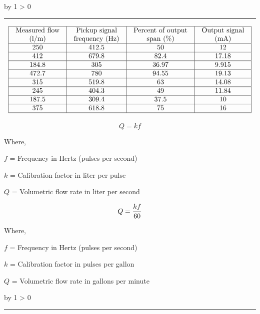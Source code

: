 \documentclass[12pt,a4paper]{article}
\def\svar{
           \advance\answnum by 1
           \ifnum \answnum > 0
                \hrule
                \vskip 3pt
                \leftline{Svar \the\answnum}
                \vskip 3pt \fi}
\def\notes{
           \advance\explnum by 1
           \ifnum \explnum > 0
                \hrule
                \vskip 3pt
                \leftline{Notes \the\explnum}
                \vskip 3pt \fi}
\begin{document}
\vskip 10pt \filbreak 





\svar{} 


$$\vbox{\offinterlineskip
\halign{\strut
\vrule \quad\hfil # \ \hfil & 
\vrule \quad\hfil # \ \hfil & 
\vrule \quad\hfil # \ \hfil & 
\vrule \quad\hfil # \ \hfil \vrule \cr
\noalign{\hrule}
%
Measured flow & Pickup signal & Percent of output & Output signal \cr
%
(l/m) & frequency (Hz) & span (\%) & (mA) \cr
%
\noalign{\hrule}
%
250 & 412.5 & 50 & 12 \cr
%
\noalign{\hrule}
%
412 & 679.8 & 82.4 & 17.18 \cr
%
\noalign{\hrule}
%
184.8 & 305 & 36.97 & 9.915 \cr
%
\noalign{\hrule}
%
472.7 & 780 & 94.55 & 19.13 \cr
%
\noalign{\hrule}
%
315 & 519.8 & 63 & 14.08 \cr
%
\noalign{\hrule}
%
245 & 404.3 & 49 & 11.84 \cr
%
\noalign{\hrule}
%
187.5 & 309.4 & 37.5 & 10 \cr
%
\noalign{\hrule}
%
375 & 618.8 & 75 & 16 \cr
%
\noalign{\hrule}
} %
}$$ %

$$Q = kf$$

\noindent
Where,

$f$ = Frequency in Hertz (pulses per second)

$k$ = Calibration factor in liter per pulse

$Q$ = Volumetric flow rate in liter per second

\vskip 10pt

$$Q = {kf \over 60}$$

\noindent
Where,

$f$ = Frequency in Hertz (pulses per second)

$k$ = Calibration factor in pulses per gallon

$Q$ = Volumetric flow rate in gallons per minute


\vskip 10pt \filbreak 





\notes{} 



\vfil \eject 
\end{document}
